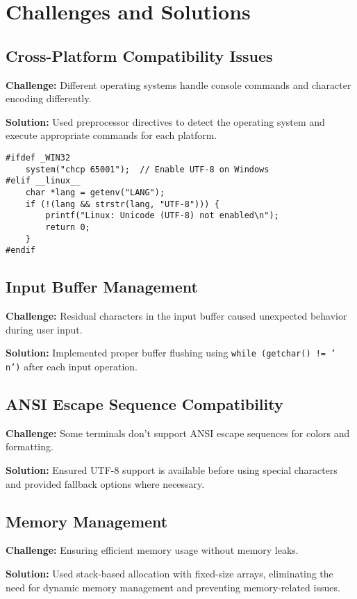 \documentclass[12pt]{article}
\begin{document}
\section{Challenges and Solutions}

\subsection{Cross-Platform Compatibility Issues}
\textbf{Challenge:} Different operating systems handle console commands and character encoding differently.

\textbf{Solution:} Used preprocessor directives to detect the operating system and execute appropriate commands for each platform.

\begin{lstlisting}[caption=Platform-Specific Solutions]
#ifdef _WIN32
    system("chcp 65001");  // Enable UTF-8 on Windows
#elif __linux__
    char *lang = getenv("LANG");
    if (!(lang && strstr(lang, "UTF-8"))) {
        printf("Linux: Unicode (UTF-8) not enabled\n");
        return 0;
    }
#endif
\end{lstlisting}

\subsection{Input Buffer Management}
\textbf{Challenge:} Residual characters in the input buffer caused unexpected behavior during user input.

\textbf{Solution:} Implemented proper buffer flushing using \texttt{while (getchar() != '\\n')} after each input operation.

\subsection{ANSI Escape Sequence Compatibility}
\textbf{Challenge:} Some terminals don't support ANSI escape sequences for colors and formatting.

\textbf{Solution:} Ensured UTF-8 support is available before using special characters and provided fallback options where necessary.

\subsection{Memory Management}
\textbf{Challenge:} Ensuring efficient memory usage without memory leaks.

\textbf{Solution:} Used stack-based allocation with fixed-size arrays, eliminating the need for dynamic memory management and preventing memory-related issues.
\end{document}
